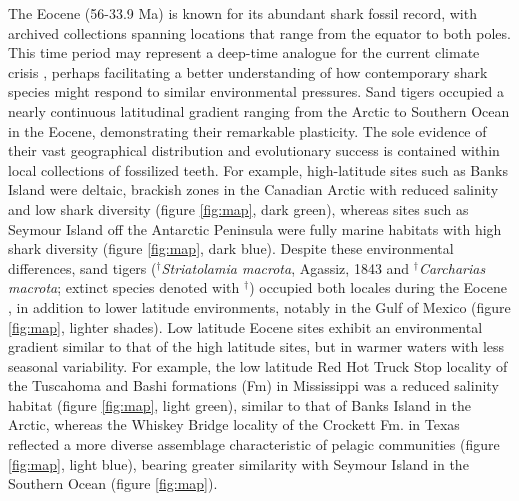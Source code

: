 \documentclass[]{rsos}%
\begin{document}
The Eocene (56-33.9 Ma) is known for its abundant shark fossil record, with archived collections spanning locations that range from the equator to both poles.
This time period may represent a deep-time analogue for the current climate crisis \cite{burke2018pliocene}, perhaps facilitating a better understanding of how contemporary shark species might respond to similar environmental pressures.
Sand tigers occupied a nearly continuous latitudinal gradient ranging from the Arctic to Southern Ocean in the Eocene, demonstrating their remarkable plasticity. 
The sole evidence of their vast geographical distribution and evolutionary success is contained within local collections of fossilized teeth.
For example, high-latitude sites such as Banks Island were deltaic, brackish zones in the Canadian Arctic with reduced salinity \cite{Waddell2008, Kim2014d} and low shark diversity \cite{greenwood2010wet, padilla2014sand}(figure \ref{fig:map}, dark green), whereas sites such as Seymour Island off the Antarctic Peninsula were fully marine  habitats \cite{Ivany2008} with high shark diversity \cite{Long1992,Kriwet2016, Kriwet2005,Reguero2012,Engelbrecht2019} (figure \ref{fig:map}, dark blue).
Despite these environmental differences, sand tigers  (${}^\dag$\emph{Striatolamia macrota}, Agassiz, 1843 and ${}^\dag$\emph{Carcharias macrota}; extinct species denoted with ${}^\dag$) occupied both locales during the Eocene \cite{Kriwet2005,Reguero2012,Padilla2014,Kriwet2016,Engelbrecht2019,purdy1998chondrichthyan}, in addition to lower latitude environments, notably in the Gulf of Mexico \cite{Westgate}(figure \ref{fig:map}, lighter shades).
Low latitude Eocene sites exhibit an environmental gradient similar to that of the high latitude sites, but in warmer waters with less seasonal variability.
For example, the low latitude Red Hot Truck Stop locality of the Tuscahoma and Bashi formations (Fm) in Mississippi was a reduced salinity habitat \cite{ingram1991tuscahoma,Beard2009} (figure \ref{fig:map}, light green), similar to that of Banks Island in the Arctic, whereas the Whiskey Bridge locality of the Crockett Fm. in Texas reflected a more diverse assemblage characteristic of pelagic communities \cite{Breard1999,Westgate,harding2014mineralogy}(figure \ref{fig:map}, light blue), bearing greater similarity with Seymour Island in the Southern Ocean (figure \ref{fig:map}). 
\end{document}
